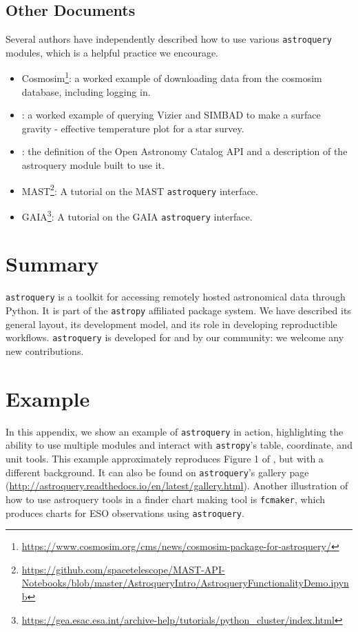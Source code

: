 \documentclass[twocolumn]{aastex62}
\newcommand{\package}[1]{\texttt{#1}\xspace}
\newcommand{\astroquery}{\package{astroquery}}
\newcommand{\astropypkg}{\package{astropy}}
\begin{document}
\subsection{Other Documents}
Several authors have independently described how to use various \astroquery
modules, which is a helpful practice we encourage.
 \begin{itemize}
    \item
        Cosmosim\footnote{\url{https://www.cosmosim.org/cms/news/cosmosim-package-for-astroquery/}}:
        a worked example of downloading data from the cosmosim database,
        including logging in.
    \item \citet{Paletou2014a}: a worked example of querying
        Vizier and SIMBAD to make a surface gravity - effective temperature
        plot for a star survey.
    \item \citet{Guillochon2018a}: the definition of
        the Open Astronomy Catalog API and a description of the astroquery
        module built to use it.
    \item
        MAST\footnote{\url{https://github.com/spacetelescope/MAST-API-Notebooks/blob/master/AstroqueryIntro/AstroqueryFunctionalityDemo.ipynb}}:
        A tutorial on the MAST \astroquery interface.
    \item GAIA\footnote{\url{https://gea.esac.esa.int/archive-help/tutorials/python_cluster/index.html}}:
        A tutorial on the GAIA \astroquery interface.
\end{itemize}


\section{Summary}
\astroquery is a toolkit for accessing remotely hosted astronomical
data through Python.  It is part of the \astropypkg affiliated package system.
We have described its general layout, its development model, and its role in
developing reproductible workflows.  \astroquery is developed for and by our
community: we welcome any new contributions.





\appendix
\section{Example}
\label{sec:example}
In this appendix, we show an example of \astroquery in action, highlighting the
ability to use multiple modules and interact with \astropypkg's table, coordinate,
and unit tools.  This example approximately reproduces Figure 1 of
\citet{Eisner2016a}, but with a different background.  It can also be found on
\astroquery's gallery page
(\url{http://astroquery.readthedocs.io/en/latest/gallery.html}).
Another illustration of how to use astroquery tools in a finder chart making
tool is \texttt{fcmaker}, which produces charts for ESO observations using
\astroquery \citep{Vogt2018a}.
\end{document}
